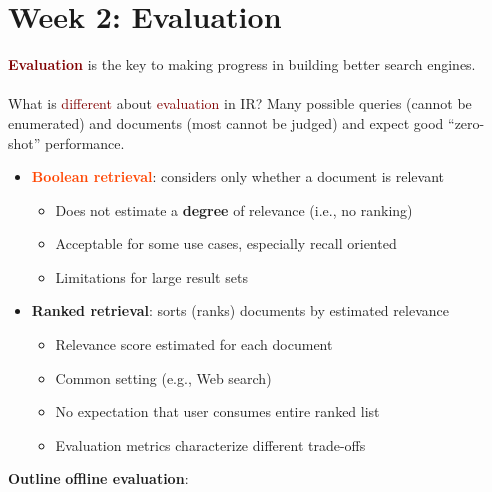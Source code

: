 \section{Week 2: Evaluation}
\textbf{\textcolor{Maroon}{Evaluation}} is the key to making progress in building better search engines.\\
\\
What is \textcolor{Maroon}{different} about \textcolor{Maroon}{evaluation} in IR? Many possible queries (cannot be enumerated) and documents (most cannot be judged) and expect good “zero-shot” performance.

\begin{itemize}
    \setlength\itemsep{0em}
    \item \textbf{\textcolor{OrangeRed}{Boolean retrieval}}: considers only whether a document is relevant
    \begin{itemize}
        \item Does not estimate a \textbf{degree} of relevance (i.e., no ranking)
        \item Acceptable for some use cases, especially recall oriented
        \item Limitations for large result sets
    \end{itemize}
    \item \textbf{\textcolor{PineGreen}{Ranked retrieval}}: sorts (ranks) documents by estimated relevance
    \begin{itemize}
        \item Relevance score estimated for each document
        \item Common setting (e.g., Web search)
        \item No expectation that user consumes entire ranked list
        \item Evaluation metrics characterize different trade-offs
    \end{itemize}
\end{itemize}
\vspace{0.2cm}

\textbf{Outline} \textbf{\textcolor{NavyBlue}{offline evaluation}}:

